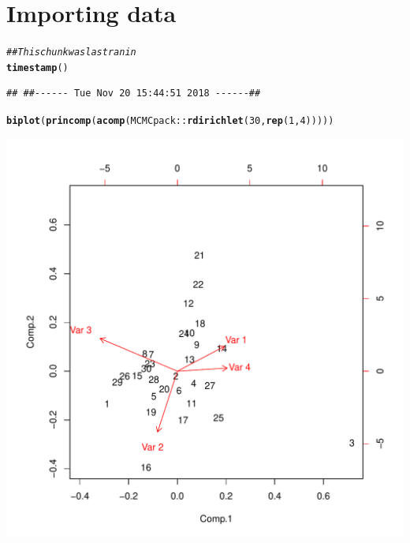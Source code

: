 \documentclass{article}\usepackage[]{graphicx}\usepackage[]{color}
\makeatletter
\def\maxwidth{ %
  \ifdim\Gin@nat@width>\linewidth
    \linewidth
  \else
    \Gin@nat@width
  \fi
}
\newcommand{\hlnum}[1]{\textcolor[rgb]{0.686,0.059,0.569}{#1}}%
\newcommand{\hlcom}[1]{\textcolor[rgb]{0.678,0.584,0.686}{\textit{#1}}}%
\newcommand{\hlopt}[1]{\textcolor[rgb]{0,0,0}{#1}}%
\newcommand{\hlstd}[1]{\textcolor[rgb]{0.345,0.345,0.345}{#1}}%
\newcommand{\hlkwd}[1]{\textcolor[rgb]{0.737,0.353,0.396}{\textbf{#1}}}%
\newenvironment{kframe}{%
 \def\at@end@of@kframe{}%
 \ifinner\ifhmode%
  \def\at@end@of@kframe{\end{minipage}}%
  \begin{minipage}{\columnwidth}%
 \fi\fi%
 \def\FrameCommand##1{\hskip\@totalleftmargin \hskip-\fboxsep
 \colorbox{shadecolor}{##1}\hskip-\fboxsep
     \hskip-\linewidth \hskip-\@totalleftmargin \hskip\columnwidth}%
 \MakeFramed {\advance\hsize-\width
   \@totalleftmargin\z@ \linewidth\hsize
   \@setminipage}}%
 {\par\unskip\endMakeFramed%
 \at@end@of@kframe}
\newenvironment{knitrout}{}{} %
\makeatother
\begin{document}
\section{Importing data}
\begin{knitrout}
\color{fgcolor}\begin{kframe}
\begin{alltt}
\hlcom{## This chunk was last ran in}
\hlkwd{timestamp}\hlstd{()}
\end{alltt}
\begin{verbatim}
## ##------ Tue Nov 20 15:44:51 2018 ------##
\end{verbatim}
\begin{alltt}
\hlkwd{biplot}\hlstd{(}\hlkwd{princomp}\hlstd{(}\hlkwd{acomp}\hlstd{(MCMCpack}\hlopt{::}\hlkwd{rdirichlet}\hlstd{(}\hlnum{30}\hlstd{,} \hlkwd{rep}\hlstd{(}\hlnum{1}\hlstd{,} \hlnum{4}\hlstd{)))))}
\end{alltt}
\end{kframe}
\includegraphics[width=\maxwidth]{figure/unnamed-chunk-7-1} 

\end{knitrout}
\end{document}
